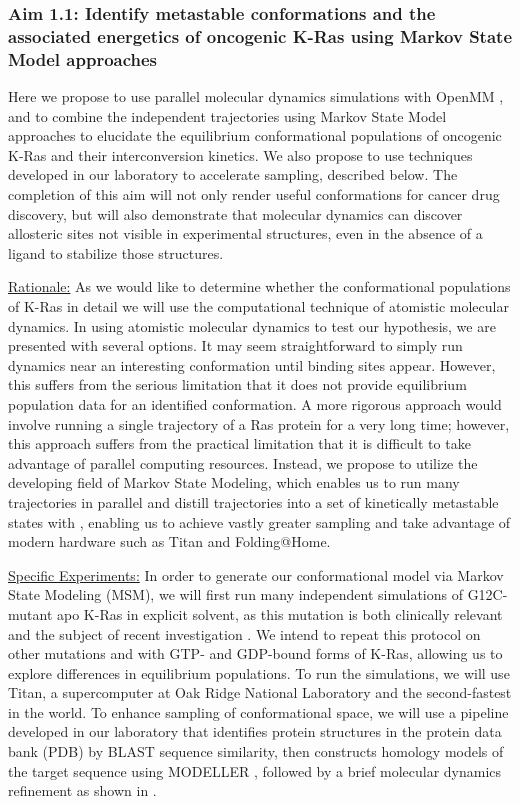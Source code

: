 \documentclass[12pt]{article}
\begin{document}
  \subsubsection*{Aim 1.1: Identify metastable conformations and the associated energetics of oncogenic K-Ras using Markov State Model approaches}
   Here we propose to use parallel molecular dynamics simulations with OpenMM \cite{openmm}, and to combine the independent trajectories using Markov State Model approaches \cite{chodera2014} to elucidate the equilibrium conformational populations of oncogenic K-Ras and their interconversion kinetics. We also propose to use techniques developed in our laboratory to accelerate sampling, described below. The completion of this aim will not only render useful conformations for cancer drug discovery, but will also demonstrate that molecular dynamics can discover allosteric sites not visible in experimental structures, even in the absence of a ligand to stabilize those structures.
   
   \underline{Rationale:} As we would like to determine whether the conformational populations of K-Ras in detail we will use the computational technique of atomistic molecular dynamics. In using atomistic molecular dynamics to test our hypothesis, we are presented with several options. It may seem straightforward to simply run dynamics near an interesting conformation until binding sites appear. However, this suffers from the serious limitation that it does not provide equilibrium population data for an identified conformation. A more rigorous approach would involve running a single trajectory of a Ras protein for a very long time; however, this approach suffers from the practical limitation that it is difficult to take advantage of parallel computing resources. Instead, we propose to utilize the developing field of Markov State Modeling, which enables us to run many trajectories in parallel and distill trajectories into a set of kinetically metastable states with  \cite{chodera2014}, enabling us to achieve vastly greater sampling and take advantage of modern hardware such as Titan and Folding@Home.
  
 \underline{Specific Experiments:} In order to generate our conformational model via Markov State Modeling (MSM), we will first run many independent simulations of G12C-mutant apo K-Ras in explicit solvent, as this mutation is both clinically relevant and the subject of recent investigation \cite{ostrem2013}. We intend to repeat this protocol on other mutations and with GTP- and GDP-bound forms of K-Ras, allowing us to explore differences in equilibrium populations. To run the simulations, we will use Titan, a supercomputer at Oak Ridge National Laboratory and the second-fastest in the world.  To enhance sampling of conformational space, we will use a pipeline developed in our laboratory that identifies protein structures in the protein data bank (PDB) by BLAST \cite{blast} sequence similarity, then constructs homology models of the target sequence using MODELLER \cite{modeller}, followed by a brief molecular dynamics refinement as shown in .  
 
\end{document}
